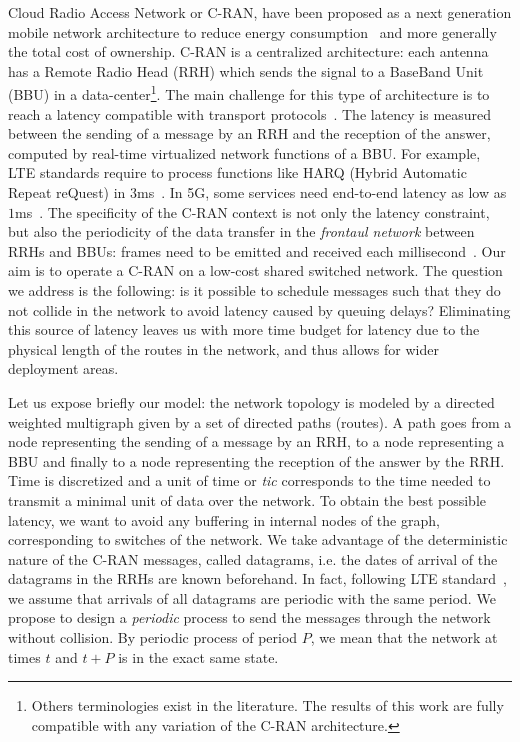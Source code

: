 \documentclass[a4paper,10pt]{journal}
\begin{document}
Cloud Radio Access Network or C-RAN, have been proposed as a next generation mobile network architecture to reduce energy consumption~\cite{mobile2011c} and more generally the total cost of ownership.
C-RAN is a centralized architecture: each antenna has a Remote Radio Head (RRH) which sends the signal to
a BaseBand Unit (BBU) in a data-center\footnote{Others terminologies exist in the literature. The results of this work are fully compatible with any variation of the C-RAN architecture.}.
The main challenge for this type of architecture is to reach a latency compatible with transport protocols~\cite{ieeep802}. The latency is measured between the sending of a message by an RRH and the reception of the answer, computed by real-time virtualized network functions of a BBU. For example, LTE standards require to process functions like HARQ (Hybrid Automatic Repeat reQuest) in $3$ms~\cite{bouguen2012lte}. In 5G, some services need end-to-end latency as low as $1$ms~\cite{3gpp5g,boccardi2014five}. The specificity of the C-RAN context is not only the latency constraint, but also the periodicity of the data transfer in the \emph{frontaul network} between RRHs and BBUs: frames need to be emitted and received each millisecond~\cite{bouguen2012lte}.
Our aim is to operate a C-RAN on a low-cost shared switched network.
The question we address is the following: is it possible to schedule messages such that they do not collide in the network to avoid latency caused by queuing delays? Eliminating this source of latency leaves us with more time budget for latency due to the physical length of the routes in the network, and thus allows for wider deployment areas.

Let us expose briefly our model: the network topology is modeled by a directed weighted multigraph given by a set of directed paths (routes). A path goes from a node representing the sending of a message by an RRH, to a node representing a BBU and finally to a node representing the reception of the answer by the RRH. Time is discretized and a unit of time or \emph{tic} corresponds to the time needed to transmit a minimal unit of data over the network. To obtain the best possible latency, we want to avoid any buffering in internal nodes of the graph, corresponding to switches of the network. We take advantage of the deterministic nature of the C-RAN messages, called datagrams, i.e. the dates of arrival of the datagrams in the RRHs are known beforehand. In fact, following LTE standard~\cite{bouguen2012lte}, we assume that arrivals of all datagrams are periodic with the same period. We propose to design a \emph{periodic} process to send the messages through the network without collision. By periodic process of period $P$, we mean that the network at times $t$ and $t+P$ is in the exact same state. 
\end{document}
